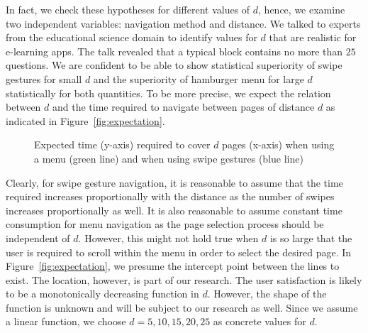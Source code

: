 \documentclass{sig-alternate-05-2015}
\begin{document}
In fact, we check these hypotheses for different values of $d$, hence, we
examine two independent variables: navigation method and distance. We talked to
experts from the educational science domain to identify values for $d$ that
are realistic for e-learning apps. The talk revealed that a typical block
contains no more than $25$ questions. We are confident to be able to show statistical
superiority of swipe gestures for small $d$ and the superiority of hamburger
menu for large $d$ statistically for both quantities.  To be more precise, we
expect the relation between $d$ and the time required to navigate between
pages of distance $d$ as indicated in Figure~\ref{fig:expectation}.
\begin{figure}
  \caption{Expected time (y-axis) required to cover $d$ pages (x-axis) when using a menu (green line) and when using swipe gestures (blue line)}
\end{figure}
Clearly, for swipe gesture navigation, it is reasonable to assume that the
time required increases proportionally with the distance as the number of
swipes increases proportionally as well.  It is also reasonable to assume
constant time consumption for menu navigation as the page selection process
should be independent of $d$. However, this might not hold true when $d$ is so
large that the user is required to scroll within the menu in order to select
the desired page. In Figure~\ref{fig:expectation}, we presume the intercept
point between the lines to exist. The location, however, is part of our
research.  The user satisfaction is likely to be a monotonically decreasing
function in $d$. However, the shape of the function is unknown and will be
subject to our research as well.
Since we assume a linear function, we choose $d = 5, 10, 15, 20, 25$ as concrete
values for $d$.
\end{document}
